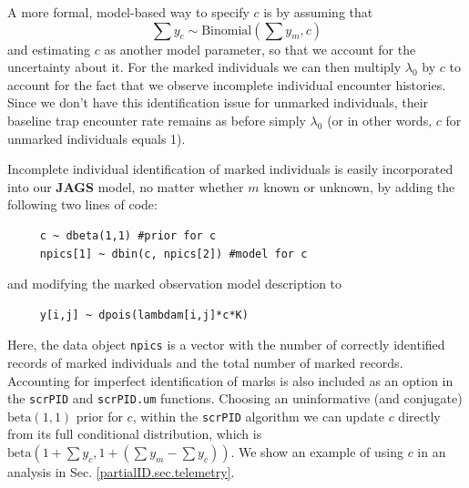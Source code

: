 A more formal, model-based way to specify $c$ is by assuming that
\[
\sum y_c \sim \mbox{Binomial}(\sum y_m, c)
\]
and estimating $c$ as another model parameter, so that we account for the uncertainty about it.
For the marked individuals we can then multiply $\lambda_0$
by $c$ to account for the fact that we observe incomplete individual
encounter histories. Since we don't have this identification issue for
unmarked individuals, their baseline trap encounter rate remains as
before simply $\lambda_0$ (or in other words, $c$ for unmarked individuals equals 1).

Incomplete individual identification of marked individuals is easily
incorporated into our {\bf JAGS} model, no matter whether $m$ known or
unknown, by adding the following two lines of code:
{\small
\begin{verbatim}
     c ~ dbeta(1,1) #prior for c
     npics[1] ~ dbin(c, npics[2]) #model for c
\end{verbatim}
}
and modifying the marked observation model description to
{\small
\begin{verbatim}
     y[i,j] ~ dpois(lambdam[i,j]*c*K)
\end{verbatim}
}
Here, the data object {\tt npics} is a vector with the number of correctly identified records of marked individuals and the total number of marked records. Accounting for imperfect identification of marks is also included as an option in the {\tt scrPID} and  {\tt scrPID.um} functions. Choosing an uninformative (and conjugate) $\mbox{beta}(1,1)$ prior for $c$, within the {\tt scrPID} algorithm we can update $c$ directly from its full conditional distribution, which is $\mbox{beta}(1 + \sum y_c, 1 + (\sum y_m-\sum y_c))$.
We show an example of using $c$ in an analysis in
Sec. \ref{partialID.sec.telemetry}.


